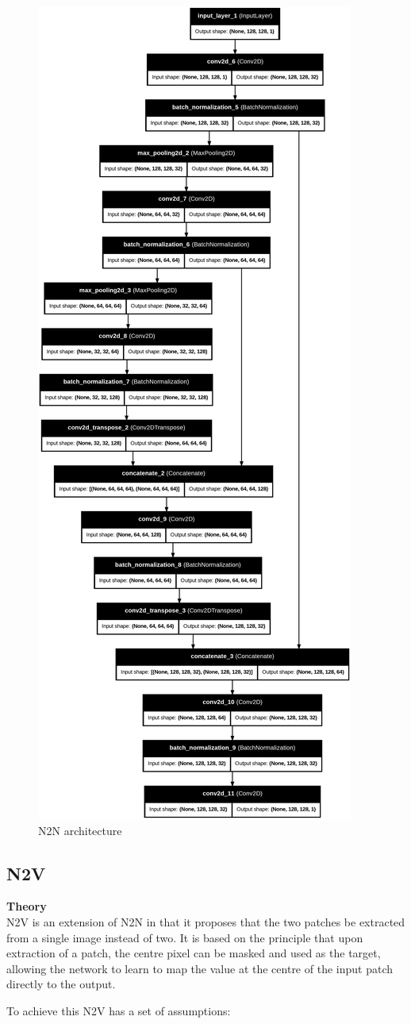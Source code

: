 \begin{figure}[h!]
	\centering
	\includegraphics[width=0.5\linewidth]{3_Chapters//3_Chapter_Methodology//Figures/noise2noise_model.png}
	\caption{\gls{N2N} architecture}
	\label{fig:N2Narch}
\end{figure}


\subsection{\gls{N2V}}
\textbf{Theory} \\
\gls{N2V} is an extension of \gls{N2N} in that it proposes that the two patches be extracted from a single image instead of two.  It is based on the principle that upon extraction of a patch, the centre pixel can be masked and used as the target, allowing the network to learn to map the value at the centre of the input patch directly to the output. 

To achieve this \gls{N2V} has a set of assumptions:

